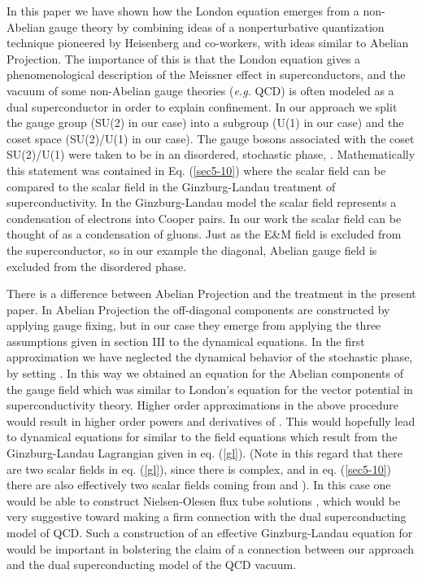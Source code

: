 \documentclass[a4paper,aps,showpacs]{revtex4}
\begin{document}
In this paper we have shown how the London equation emerges
from a non-Abelian gauge theory by combining ideas of a
nonperturbative quantization technique pioneered
by Heisenberg and co-workers, with ideas similar to
Abelian Projection. The importance of this is that
the London equation gives a phenomenological description of
the Meissner effect in superconductors, and the vacuum of some
non-Abelian gauge theories ({\it e.g.} QCD) is often modeled as
a dual superconductor in order to explain confinement. In our
approach we split the gauge group (SU(2) in our case) into a 
subgroup (U(1) in our case) and the coset space (SU(2)/U(1) in
our case). The gauge bosons associated with the coset SU(2)/U(1)
were taken to be in an disordered, stochastic phase,
\coordHE{}. Mathematically
this statement was contained in Eq. (\ref{sec5-10}) where the
scalar field can be compared to the scalar field in the Ginzburg-Landau
treatment of superconductivity. In the Ginzburg-Landau model
the scalar field represents a condensation of electrons into
Cooper pairs. In our work the scalar field can be thought
of as a condensation of gluons. Just as the E\&M field is
excluded from the superconductor, so in our example the diagonal,
Abelian gauge field is excluded from the disordered phase.

There is a difference between Abelian Projection and
the treatment in the present paper. In Abelian Projection the
off-diagonal components are constructed by applying gauge
fixing, but in our case they emerge from applying the
three assumptions given in section III to the dynamical
equations. In the first approximation we have
neglected the dynamical behavior of the stochastic phase,
by setting \coordHE{}. In this way
we obtained an equation for the Abelian components
of the gauge field which was similar to London's equation for
the vector potential in superconductivity theory. Higher
order approximations in the above procedure would result in
higher order powers and derivatives of \myHighlight{$\varphi$}\coordHE{}. This would
hopefully lead to dynamical equations for \coordHE{}
similar to the field equations which result from
the Ginzburg-Landau Lagrangian given in eq. (\ref{gl}).
(Note in this regard that there are two scalar fields
in eq. (\ref{gl}), since there \myHighlight{$\varphi$}\coordHE{} is complex, and
in eq. (\ref{sec5-10}) there are also effectively two scalar
fields coming from \coordHE{} and \coordHE{}).
In this case one would be able to construct Nielsen-Olesen
flux tube solutions \cite{no}, which would be very suggestive
toward making a firm connection with the dual
superconducting model of QCD. Such a construction of
an effective Ginzburg-Landau equation for
\myHighlight{$\varphi$}\coordHE{} would be important in bolstering the claim of a
connection between our approach and the dual superconducting
model of the QCD vacuum.
\end{document}
